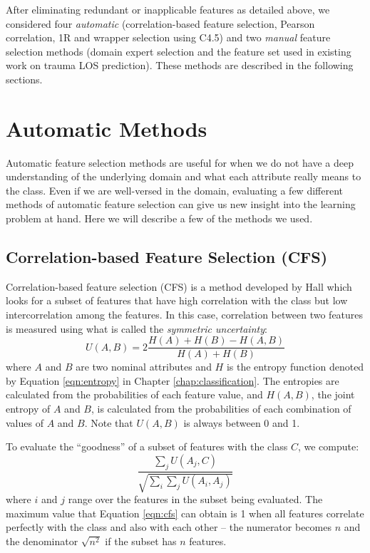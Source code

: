 After eliminating redundant or inapplicable features as detailed above, we
considered four \textit{automatic} (correlation-based
feature selection, Pearson correlation, 1R and wrapper selection
using C4.5) and two \textit{manual} feature selection methods (domain expert
selection and the feature set used in existing work on trauma LOS prediction).
These methods are described in the following sections.

\section{Automatic Methods}
Automatic feature selection methods are useful for when we do not have a deep
understanding of the underlying domain and what each attribute really means to
the class. Even if we are well-versed in the domain, evaluating a few different
methods of automatic feature selection can give us new insight into the
learning problem at hand. Here we will describe a few of the methods we used.

\subsection{Correlation-based Feature Selection (CFS)}
Correlation-based feature selection (CFS) is a method developed by Hall
\cite{Hall2000} which looks for a subset of features that have high correlation
with the class but low intercorrelation among the features. In this case,
correlation between two features is measured using what is called the
\textit{symmetric uncertainty}:
\begin{equation*}
U(A,B) = 2\dfrac{H(A)+H(B)-H(A,B)}{H(A)+H(B)}
\end{equation*}
where $A$ and $B$ are two nominal attributes and $H$ is the entropy function
denoted by Equation \ref{eqn:entropy} in Chapter \ref{chap:classification}.
The entropies are calculated from the probabilities of each feature value, and
$H(A,B)$, the joint entropy of $A$ and $B$, is calculated from the
probabilities of each combination of values of $A$ and $B$. Note that $U(A,B)$
is always between 0 and 1.

To evaluate the ``goodness'' of a subset of features with the class $C$, we
compute:
\begin{equation}
\label{eqn:cfs}
\dfrac{\sum_j U(A_j,C)}{\sqrt{\sum_i \sum_j U(A_i,A_j)}}
\end{equation}
where $i$ and $j$ range over the features in the subset being evaluated. The
maximum value that Equation \ref{eqn:cfs} can obtain is 1 when all features
correlate perfectly with the class and also with each other -- the numerator
becomes $n$ and the denominator $\sqrt{n^2}$ if the subset has $n$ features.

